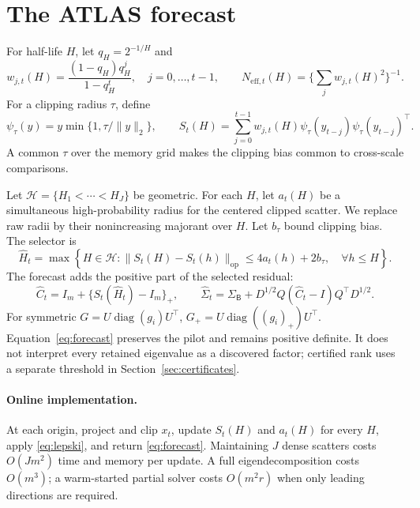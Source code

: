 \documentclass{article}
\theoremstyle{definition}
\theoremstyle{remark}
\newcommand{\Hh}{\mathcal{H}}
\newcommand{\diag}{\operatorname{diag}}
\newcommand{\op}{\mathrm{op}}
\newcommand{\base}{\mathsf{B}}
\begin{document}
\section{The ATLAS forecast}
\label{sec:algorithm}

For half-life $H$, let $q_H=2^{-1/H}$ and
\begin{equation}
 w_{j,t}(H)=\frac{(1-q_H)q_H^j}{1-q_H^t},\quad j=0,\ldots,t-1,
 \qquad
 N_{\mathrm{eff},t}(H)=\Big\{\textstyle\sum_j w_{j,t}(H)^2\Big\}^{-1}.
 \label{eq:weights}
\end{equation}
For a clipping radius $\tau$, define
\begin{equation}
 \psi_\tau(y)=y\min\{1,\tau/\|y\|_2\},\qquad
 S_t(H)=\sum_{j=0}^{t-1}w_{j,t}(H)\psi_\tau(y_{t-j})\psi_\tau(y_{t-j})^\top.
 \label{eq:scatter}
\end{equation}
A common $\tau$ over the memory grid makes the clipping bias common to cross-scale comparisons.

Let $\Hh=\{H_1<\cdots<H_J\}$ be geometric. For each $H$, let $a_t(H)$ be a simultaneous high-probability radius for the centered clipped scatter. We replace raw radii by their nonincreasing majorant over $H$. Let $b_\tau$ bound clipping bias. The selector is
\begin{equation}
 \widehat H_t=\max\left\{H\in\Hh:
 \|S_t(H)-S_t(h)\|_{\op}\le4a_t(h)+2b_\tau,
 \quad \forall h\le H\right\}.
 \label{eq:lepski}
\end{equation}
The forecast adds the positive part of the selected residual:
\begin{equation}
 \widehat C_t=I_m+\{S_t(\widehat H_t)-I_m\}_{+},
 \qquad
 \widehat\Sigma_t=\Sigma_{\base}+D^{1/2}Q(\widehat C_t-I)Q^\top D^{1/2}.
 \label{eq:forecast}
\end{equation}
For symmetric $G=U\diag(g_i)U^\top$, $G_+=U\diag((g_i)_+)U^\top$. Equation~\eqref{eq:forecast} preserves the pilot and remains positive definite. It does not interpret every retained eigenvalue as a discovered factor; certified rank uses a separate threshold in Section~\ref{sec:certificates}.

\paragraph{Online implementation.}
At each origin, project and clip $x_t$, update $S_t(H)$ and $a_t(H)$ for every $H$, apply \eqref{eq:lepski}, and return \eqref{eq:forecast}. Maintaining $J$ dense scatters costs $O(Jm^2)$ time and memory per update. A full eigendecomposition costs $O(m^3)$; a warm-started partial solver costs $O(m^2r)$ when only leading directions are required.
\end{document}
